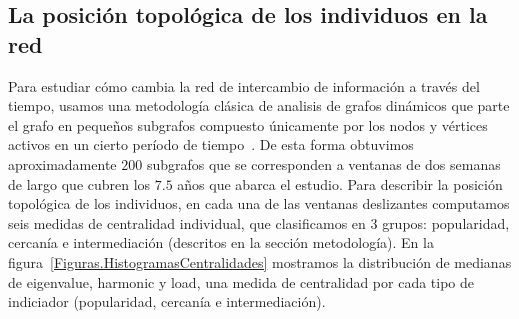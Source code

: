 \documentclass[a4paper,11pt]{book}
\theoremstyle{definition}
\begin{document}
\subsection{La posición topológica de los individuos en la red} \label{sec:results_centralities}
Para estudiar cómo cambia la red de intercambio de información a través del tiempo, usamos una metodología clásica de analisis de grafos dinámicos que parte el grafo en pequeños subgrafos compuesto únicamente por los nodos y vértices activos en un cierto período de tiempo~\cite{Kossinets2006}.
%
De esta forma obtuvimos aproximadamente $200$ subgrafos que se corresponden a ventanas de dos semanas de largo que cubren los $7.5$ años que abarca el estudio.
%
Para describir la posición topológica de los individuos, en cada una de las ventanas deslizantes computamos seis medidas de centralidad individual, que clasificamos en 3 grupos: popularidad, cercanía e intermediación (descritos en la sección metodología).
En la figura~\ref{Figuras.HistogramasCentralidades} mostramos la distribución de medianas de eigenvalue, harmonic y load, una medida de centralidad por cada tipo de indiciador (popularidad, cercanía e intermediación).
%
\end{document}
